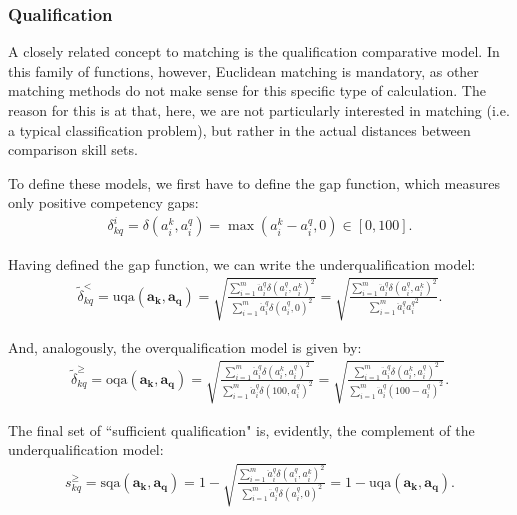 \documentclass{elsarticle} %
\begin{document}
\subsubsection{Qualification}
A closely related concept to matching is the qualification comparative model.
In this family of functions, however, Euclidean matching is mandatory, as other
matching methods do not make sense for this specific type of calculation. The
reason for this is at that, here, we are not particularly interested in
matching (i.e. a typical classification problem), but rather in the actual
distances between comparison skill sets.

To define these models, we first have to define the gap function, which
measures only positive competency gaps:
\begin{gather}
    \delta_{kq}^{i} =
    \delta(a_{i}^{k}, a_{i}^{q}) =
    \max(
    a_{i}^{k} - a_{i}^{q}
    , 0
    )
    \in [0, 100]
    .
\end{gather}

Having defined the gap function, we can write the underqualification model:
\begin{gather}
    \tilde{\delta}_{kq}^{<} =
    \text{uqa}(\boldsymbol{a_k}, \boldsymbol{a_q}) =
    \sqrt{
    \frac{
    \sum_{i=1}^{m}{
    \ddot{a}_{i}^{q} {\delta(a_{i}^{q}, a_{i}^{k})} ^ 2
    }
    }{
    \sum_{i=1}^{m}{
    \ddot{a}_{i}^{q} {\delta(a_{i}^{q}, 0)} ^ 2
    }
    }
    } =
    \sqrt{
    \frac{
    \sum_{i=1}^{m}{
    \ddot{a}_{i}^{q} {\delta(a_{i}^{q}, a_{i}^{k})} ^ 2
    }
    }{
    \sum_{i=1}^{m}{
    \ddot{a}_{i}^{q} {a_{i}^{q}} ^ 2
    }
    }
    }
    .
\end{gather}

And, analogously, the overqualification model is given by:
\begin{gather}
    \tilde{\delta}_{kq}^{\geq} =
    \text{oqa}(\boldsymbol{a_k}, \boldsymbol{a_q}) =
    \sqrt{
    \frac{
    \sum_{i=1}^{m}{
    \ddot{a}_{i}^{q} {\delta(a_{i}^{k}, a_{i}^{q})} ^ 2
    }
    }{
    \sum_{i=1}^{m}{
    \ddot{a}_{i}^{q} {\delta(100, a_{i}^{q})} ^ 2
    }
    }
    } =
    \sqrt{
    \frac{
    \sum_{i=1}^{m}{
    \ddot{a}_{i}^{q} {\delta(a_{i}^{k}, a_{i}^{q})} ^ 2
    }
    }{
    \sum_{i=1}^{m}{
    \ddot{a}_{i}^{q} {(100 - a_{i}^{q})} ^ 2
    }
    }
    }
    .
\end{gather}

The final set of ``sufficient qualification" is, evidently, the complement of
the underqualification model:
\begin{gather}
    s_{kq}^{\geq} =
    \text{sqa}(\boldsymbol{a_k}, \boldsymbol{a_q}) =
    1 -
    \sqrt{
    \frac{
    \sum_{i=1}^{m}{
    \ddot{a}_{i}^{q} {\delta(a_{i}^{q}, a_{i}^{k})} ^ 2
    }
    }{
    \sum_{i=1}^{m}{
    \ddot{a}_{i}^{q} {\delta(a_{i}^{q}, 0)} ^ 2
    }
    }
    } =
    1 - \text{uqa}(\boldsymbol{a_k}, \boldsymbol{a_q})
    .
\end{gather}
\end{document}
